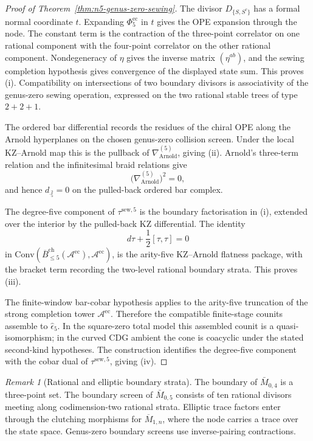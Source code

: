 \documentclass[11pt,reqno]{amsart}
\theoremstyle{definition}
\theoremstyle{remark}
\newtheorem{remark}[theorem]{Remark}
\newcommand{\cA}{\mathcal{A}}
\newcommand{\barB}{\overline{B}}
\newcommand{\Conv}{\mathrm{Conv}}
\newcommand{\dbar}{d_{\bar{}}}
\begin{document}
\begin{proof}[Proof of Theorem~\ref{thm:n5-genus-zero-sewing}]
The divisor $D_{\{S,S^c\}}$ has a formal normal coordinate $t$.
Expanding $\Phi^{\mathrm{ec}}_5$ in $t$ gives the OPE expansion
through the node. The constant term is the contraction of the
three-point correlator on one rational component with the four-point
correlator on the other rational component. Nondegeneracy of
$\eta$ gives the inverse matrix $(\eta^{ab})$, and the sewing
completion hypothesis gives convergence of the displayed state sum.
This proves \textup{(i)}. Compatibility on intersections of two
boundary divisors is associativity of the genus-zero sewing
operation, expressed on the two rational stable trees of type
$2+2+1$.

The ordered bar differential records the residues of the chiral OPE
along the Arnold hyperplanes on the chosen genus-zero collision
screen. Under the local KZ--Arnold map this is the pullback of
$\nabla_{\mathrm{Arnold}}^{(5)}$, giving \textup{(ii)}. Arnold's
three-term relation and the infinitesimal braid relations give
\[
\bigl(\nabla^{(5)}_{\mathrm{Arnold}}\bigr)^2=0,
\]
and hence $\dbar_5^2=0$ on the pulled-back ordered bar complex.

The degree-five component of $\tau^{\mathrm{sew},5}$ is the
boundary factorisation in \textup{(i)}, extended over the interior
by the pulled-back KZ differential. The identity
\[
d\tau+\frac12[\tau,\tau]=0
\]
in
$\Conv(\barB^{\mathrm{ch}}_{\le 5}(\cA^{\mathrm{ec}}),\cA^{\mathrm{ec}})$,
is the arity-five KZ--Arnold flatness package, with the bracket
term recording the two-level rational boundary strata. This proves
\textup{(iii)}.

The finite-window bar-cobar hypothesis applies to the arity-five
truncation of the strong completion tower $\cA^{\mathrm{ec}}$.
Therefore the compatible finite-stage counits assemble to
$\widehat\epsilon_5$. In the square-zero total model this assembled
counit is a quasi-isomorphism; in the curved CDG ambient the cone is
coacyclic under the stated second-kind hypotheses. The construction
identifies the degree-five component with the cobar dual of
$\tau^{\mathrm{sew},5}$, giving \textup{(iv)}.
\end{proof}

\begin{remark}[Rational and elliptic boundary strata]
\label{rem:n5-rational-elliptic}
The boundary of $\bar M_{0,4}$ is a three-point set. The boundary
screen of $\bar M_{0,5}$ consists of ten rational divisors meeting
along codimension-two rational strata. Elliptic trace factors enter
through the clutching morphisms for \(\overline M_{1,n}\), where
the node carries a trace over the state space. Genus-zero boundary
screens use inverse-pairing contractions.
\end{remark}
\end{document}
